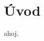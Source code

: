 \documentclass[main.tex]{subfiles}
\begin{document}
\section*{Úvod}

ahoj. \cite{st}
\end{document}
